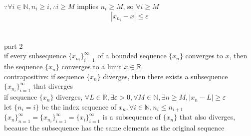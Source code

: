 \documentclass[12pt, border = 4pt, multi]{article} %
\begin{document}
$\because \forall i \in \mathbb{N}, n_i \geq i, \therefore i \geq M$ implies $n_i \geq M$, so $\forall i \geq M$
\[|x_{n_i} - x| \leq \varepsilon\]
\\
\\
part 2\\
if every subsequence $\{x_{n_i}\}_{i = 1} ^ {\infty}$ of a bounded sequence $\{x_n\}$ converges to $x$, then the sequence $\{x_n\}$ converges to a limit $x \in \mathbb{R}$\\
contrapositive: if sequence $\{x_n\}$ diverges, then there exists a subsequence $\{x_{n_i}\}_{i = 1} ^ {\infty}$ that diverges\\
if sequence $\{x_n\}$ diverges, $\forall L \in \mathbb{R}, \exists \varepsilon > 0, \forall M \in \mathbb{N}, \exists n \geq M, |x_n - L| \geq \varepsilon$\\
let $\{n_i = i\}$ be the index sequence of $x_n, \forall i \in \mathbb{N}, n_i \leq n_{i + 1}$\\
$\{x_n\}_{n = 1} ^ {\infty} = \{x_{n_i}\}_{i = 1} ^ {\infty} = \{x_i\}_{i = 1} ^ {\infty}$ is a subsequence of $\{x_n\}$ that also diverges, because the subsequence has the same elements as the original sequence
\end{document}
